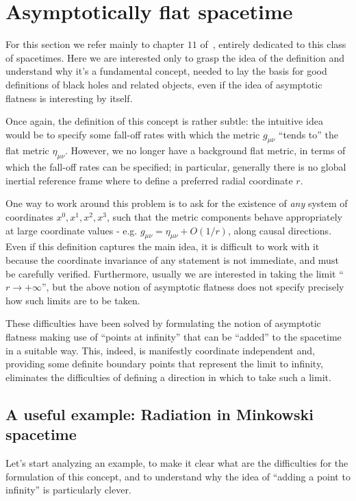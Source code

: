 \section{Asymptotically flat spacetime}
For this section we refer mainly to chapter \(11\) of~\cite{wald1991general}, entirely dedicated to this class of spacetimes.
Here we are interested only to grasp the idea of the definition and understand why it's a fundamental concept, needed to lay the basis for good definitions of black holes and related objects, even if the idea of asymptotic flatness is interesting by itself.

Once again, the definition of this concept is rather subtle: the intuitive idea would be to specify some fall-off rates with which the metric \(g_{\mu\nu}\) ``tends to'' the flat metric  \(\eta_{\mu\nu}\). However, we no longer have a background flat metric, in terms of which the fall-off rates can be specified; in particular, generally there is no global inertial reference frame where to define a preferred radial coordinate \(r\).

One way to work around this problem is to ask for the existence of \emph{any} system of coordinates \(x^0, x^1, x^2, x^3\), such that the metric components behave appropriately at large coordinate values - e.g. \(g_{\mu\nu} = \eta_{\mu\nu} + O(1/r)\), along causal directions.
Even if this definition captures the main idea, it is difficult to work with it because the coordinate invariance of any statement is not immediate, and must be carefully verified.
Furthermore, usually we are interested in taking the limit ``\(r \rightarrow +\infty\)'', but the above notion of asymptotic flatness does not specify precisely how such limits are to be taken.

These difficulties have been solved by formulating the notion of asymptotic flatness making use of ``points at infinity'' that can be ``added'' to the spacetime in a suitable way. This, indeed, is manifestly coordinate independent and, providing some definite boundary points that represent the limit to infinity, eliminates the difficulties of defining a direction in which to take such a limit.

\subsection{A useful example: Radiation in Minkowski spacetime}
Let's start analyzing an example, to make it clear what are the difficulties for the formulation of this concept, and to understand why the idea of ``adding a point to infinity'' is particularly clever.

